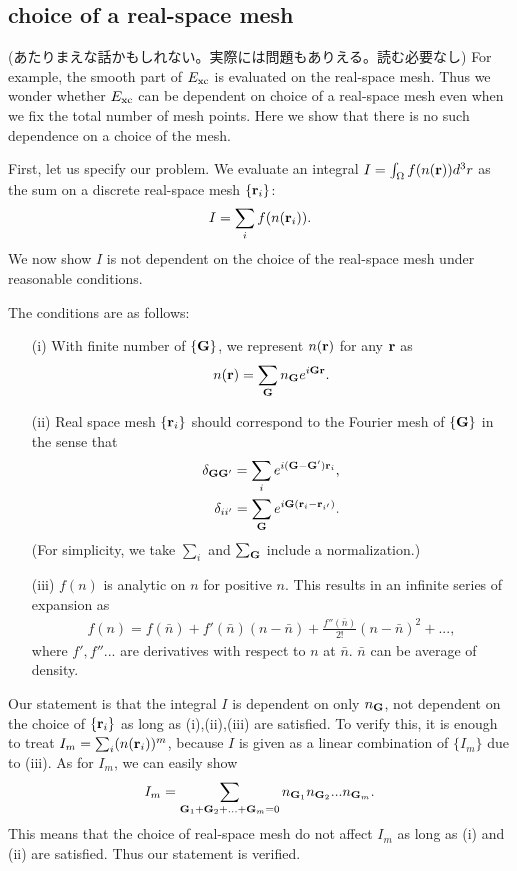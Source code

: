 \documentclass[a4paper,10pt,aip,onecolumn,amsmath,amssymb,floatfix,rmp]{revtex4-1}
\newcommand{\bfr}{{\bf r}}
\newcommand{\bfG}{{\bf G}}
\begin{document}
\subsection{choice of a real-space mesh}
\label{sec:realmesh}
(あたりまえな話かもしれない。実際には問題もありえる。読む必要なし)
For example, the smooth part of $E_{\rm xc}$ is evaluated on
the real-space mesh. Thus we wonder whether $E_{\rm xc}$ can be
dependent on choice of a real-space mesh even when we fix the total
number of mesh points. Here we show that there is no 
such dependence on a choice of the mesh.

First, let us specify our problem. We evaluate an integral 
$I=\int_\Omega f(n(\bfr)) d^3r$ as the sum on a discrete real-space mesh 
$\{\bfr_i\}$:
\begin{eqnarray}
I= \sum_{i} f(n(\bfr_{i})). \label{isum}
\end{eqnarray}
We now show $I$ is not dependent on the choice of the real-space mesh
under reasonable conditions.

The conditions are as follows:
\begin{itemize}
\item[(i)]
With finite number of $\{\bfG\}$, we represent $n(\bfr)$ for any $\bfr$ as
\begin{eqnarray}
n(\bfr)= \sum_{\bfG} n_\bfG e^{i \bfG \bfr}.
\end{eqnarray}
\item[(ii)]
Real space mesh $\{\bfr_{i}\}$ should correspond to the Fourier mesh of
$\{\bfG\}$ in the sense that
\begin{eqnarray}
\delta_{\bfG\bfG'}= \sum_{i} e^{i (\bfG-\bfG') \bfr_{i}},\nonumber \\
\delta_{ii'}= \sum_{\bfG} e^{i \bfG(\bfr_i-\bfr_{i'})}.
\end{eqnarray}
(For simplicity, we take $\sum_i$ and $\sum_\bfG$ include a normalization.)
\item[(iii)]
$f(n)$ is analytic on $n$ for positive $n$. This results in
	   an infinite series of expansion as 
\begin{eqnarray}
f(n)\!=\! f(\bar{n}) 
\!+\! f'(\bar{n}) (n-\bar{n}) \!+\! \frac{f''(\bar{n}) }{2!} (n-\bar{n})^2 \!+\!... , \label{fexpand}
\end{eqnarray}
where $f',f''...$ are derivatives with respect to $n$ at $\bar{n}$.
$\bar{n}$ can be average of density.
\end{itemize}

Our statement is that the integral $I$ is dependent on only $n_\bfG$, not
dependent on the choice of $\{\bfr_i\}$ as long as (i),(ii),(iii) are
satisfied. To verify this, it is enough to treat 
$I_m=\sum_i (n(\bfr_i))^m$, because
$I$ is given as a linear combination of $\{I_m\}$
due to (iii). As for $I_m$, we can easily show
\begin{eqnarray}
I_m = \sum_{\bfG_1+\bfG_2+...+\bfG_m=0} n_{\bfG_1} n_{\bfG_2} ... n_{\bfG_m}.
\end{eqnarray}
This means that the choice of real-space mesh do not affect $I_m$
as long as (i) and (ii) are satisfied. Thus our statement is verified.
\end{document}
